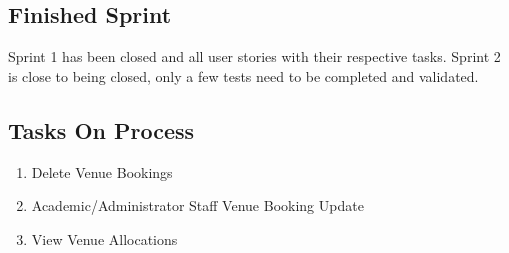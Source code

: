\documentclass[11pt]{article}
\begin{document}
\subsection{Finished Sprint}
Sprint 1 has been closed and all user stories with their respective tasks. Sprint 2 is close to being closed, only a few tests need to be completed and validated.

\subsection{Tasks On Process}
\begin{enumerate}
\item Delete Venue Bookings
\item Academic/Administrator Staff Venue Booking Update
\item View Venue Allocations
\end{enumerate}
\end{document}
